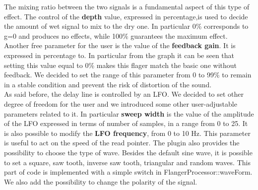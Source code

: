The mixing ratio between the two signals is a fundamental aspect of this type of effect. The control of the \textbf{depth} value, expressed in percentage,is used to decide the amount of wet signal to mix to the dry one. In particular 0\% corresponds to g=0 and produces no effects, while 100\% guarantees the maximum effect.\\
Another free parameter for the user is the value of the \textbf{feedback gain}. It is expressed in percentage to. In particular from the graph it can be seen that setting this value equal to 0\% makes this flager match the basic one without feedback. We decided to set the range of this parameter from 0 to 99\% to remain in a stable condition and prevent the risk of distortion of the sound.\\
As said before, the delay line is controlled by an LFO. We decided to set other degree of freedom for the user and we introduced some other user-adjustable parameters related to it. In particular \textbf{sweep width} is the value of the amplitude of the LFO expressed in terms of number of samples, in a range from  0 to 25. It is also possible to modify the \textbf{LFO frequency}, from 0 to 10 Hz. This parameter is useful to act on the speed of the read pointer. The plugin also provides the possibility to choose the type of wave. Besides the default sine wave, it is possible to set a square, saw tooth, inverse saw tooth, triangular and random waves. This part of code is implemented with a simple switch in FlangerProcessor::waveForm.
We also add the possibility to change the polarity of the signal.



